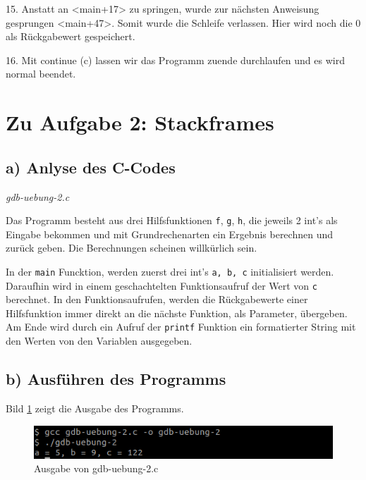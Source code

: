 \documentclass[12pt]{article}
\begin{document}

15. Anstatt an <main+17> zu springen, wurde zur nächsten Anweisung gesprungen <main+47>. Somit wurde die Schleife verlassen. Hier wird noch die 0 als Rückgabewert gespeichert. 


16. Mit continue (c) lassen wir das Programm zuende durchlaufen und es wird normal beendet.


\section{Zu Aufgabe 2: Stackframes}
\subsection{a) Anlyse des C-Codes}

\textit{gdb-uebung-2.c}



Das Programm besteht aus drei Hilfsfunktionen \texttt{f}, \texttt{g}, \texttt{h}, die jeweils 2 int's als Eingabe bekommen und mit Grundrechenarten ein Ergebnis berechnen und zurück geben. Die Berechnungen scheinen willkürlich sein. 

In der \texttt{main} Funcktion, werden zuerst drei int's \texttt{a, b, c} initialisiert werden. Daraufhin wird in einem geschachtelten Funktionsaufruf der Wert von \texttt{c} berechnet. In den Funktionsaufrufen, werden die Rückgabewerte einer Hilfsfunktion immer direkt an die nächste Funktion, als Parameter, übergeben. Am Ende wird durch ein Aufruf der \texttt{printf} Funktion ein formatierter String mit den Werten von den Variablen ausgegeben.


\subsection{b) Ausführen des Programms}

Bild \ref{fig:aufgabe2b} zeigt die Ausgabe des Programms.
\begin{figure}[h!]
	\includegraphics[width=\textwidth]{Pictures/a2b.png}
	\caption{Ausgabe von gdb-uebung-2.c}
	\label{fig:aufgabe2b}
\end{figure}
\end{document}
